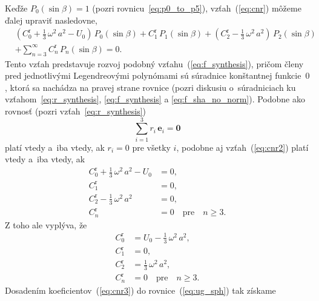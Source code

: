 \documentclass[a4paper, 12pt]{book}
\let\vec\mathbf
\begin{document}
Keďže $P_0(\sin\beta) = 1$ (pozri rovnicu~\ref{eq:p0_to_p5}), 
vzťah~(\ref{eq:cnr}) môžeme ďalej upraviť nasledovne,
%
\begin{equation}
\label{eq:cnr2}
\begin{split}
&\left( C_0^\mathrm{r} + \frac{1}{3} \, \omega^2 \, a^2 - U_0 \right) \, 
P_0(\sin\beta) + C_1^\mathrm{r} \, P_1(\sin\beta) + \left(C_2^\mathrm{r} 
- \frac{1}{3} \, \omega^2 \, a^2 \right) \, P_2(\sin\beta)\\
%
&+ \sum_{n = 3}^\infty C^{\mathrm{r}}_n \, P_n(\sin\beta) = 0{.}
\end{split}
\end{equation}
%
Tento vzťah predstavuje rozvoj podobný vzťahu~(\ref{eq:f_synthesis}), pričom 
členy pred jednotlivými Legendreovými polynómami sú súradnice konštantnej 
funkcie~$0$, ktorá sa nachádza na pravej strane rovnice (pozri diskusiu 
o~súradniciach ku vzťahom~\ref{eq:r_synthesis}, \ref{eq:f_synthesis} 
a \ref{eq:f_sha_no_norm}).  Podobne ako rovnosť (pozri 
vzťah~\ref{eq:r_synthesis})
%
\begin{equation}
\sum_{i = 1}^3 r_i \, \vec{e}_i = \vec{0}
\end{equation}
%
platí vtedy a~iba vtedy, ak $r_i = 0$ pre všetky $i$, podobne aj 
vzťah~(\ref{eq:cnr2}) platí vtedy a~iba vtedy, ak
%
\begin{equation}
\begin{split}
C_0^\mathrm{r} + \frac{1}{3} \, \omega^2 \, a^2 - U_0 &= 0{,}\\
C_1^\mathrm{r}                                        &= 0{,}\\
C_2^\mathrm{r} - \frac{1}{3} \, \omega^2 \, a^2       &= 0{,}\\
C_n^\mathrm{r}                                        &= 0 \quad \textrm{pre} 
\quad n \geq 3{.}
\end{split}
\end{equation}
%
Z toho ale vyplýva, že
%
\begin{equation}
\label{eq:cnr3}
\begin{split}
C_0^\mathrm{r} &= U_0 - \frac{1}{3} \, \omega^2 \, a^2{,}\\
C_1^\mathrm{r} &= 0{,}\\
C_2^\mathrm{r} &= \frac{1}{3} \, \omega^2 \, a^2{,}\\
C_n^\mathrm{r} &= 0 \quad \textrm{pre} \quad n \geq 3{.}
\end{split}
\end{equation}
%
Dosadením koeficientov~(\ref{eq:cnr3}) do rovnice~(\ref{eq:ug_sph}) tak získame 
\end{document}
